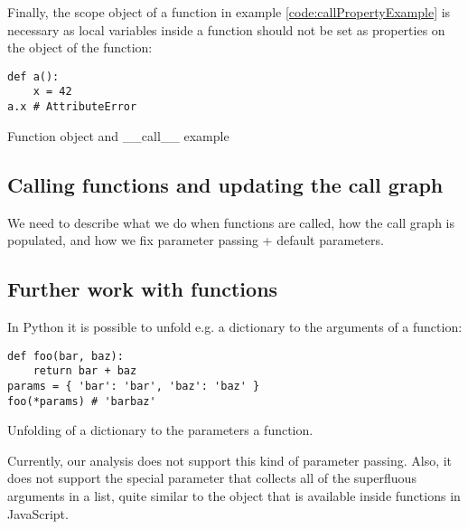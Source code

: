 Finally, the scope object of a function in example \ref{code:callPropertyExample} is necessary as local variables inside a function should not be set as properties on the object of the function:

\begin{listing}[H]
	\begin{verbatim}
def a(): 
	x = 42
a.x # AttributeError
	\end{verbatim}
\caption{Function object and \_\_call\_\_ example}\label{code:callPropertyExample}
\end{listing}


\subsection{Calling functions and updating the call graph}
We need to describe what we do when functions are called, how the call graph is populated, and how we fix parameter passing + default parameters.

\subsection{Further work with functions}
In Python it is possible to unfold e.g. a dictionary to the arguments of a function:

\begin{listing}[H]
	\begin{verbatim}
def foo(bar, baz):
	return bar + baz
params = { 'bar': 'bar', 'baz': 'baz' }
foo(*params) # 'barbaz'
	\end{verbatim}
\caption{Unfolding of a dictionary to the parameters a function.}\label{code:UnfoldDictFunctionExample}
\end{listing}

Currently, our analysis does not support this kind of parameter passing. Also, it does not support the special  parameter that collects all of the superfluous arguments in a list, quite similar to the  object that is available inside functions in JavaScript.